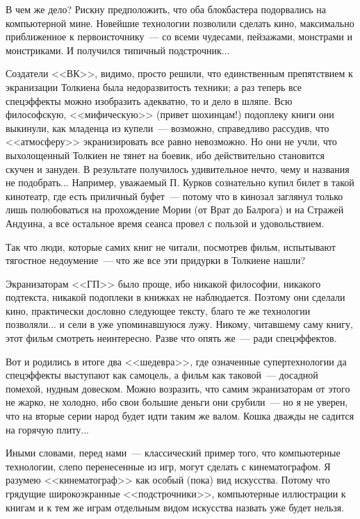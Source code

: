 \documentclass{scrbook}
\newcommand{\flqq}{<<}
\newcommand{\frqq}{>>}
\newcommand{\mdash}{~--- }
\begin{document}
В чем же дело? Рискну предположить, что оба блокбастера подорвались на компьютерной мине. Новейшие технологии позволили сделать кино, максимально приближенное к первоисточнику{\mdash}со всеми чудесами, пейзажами, монстрами и монстриками. И получился типичный подстрочник...

Создатели {\flqq}ВК{\frqq}, видимо, просто решили, что единственным препятствием к экранизации Толкиена была недоразвитость техники; а раз теперь все спецэффекты можно изобразить адекватно, то и дело в шляпе. Всю философскую, {\flqq}мифическую{\frqq} (привет шохинцам!) подоплеку книги они выкинули, как младенца из купели{\mdash}возможно, справедливо рассудив, что {\flqq}атмосферу{\frqq} экранизировать все равно невозможно. Но они не учли, что выхолощенный Толкиен не тянет на боевик, ибо действительно становится скучен и зануден. В результате получилось удивительное нечто, чему и названия не подобрать... Например, уважаемый П. Курков сознательно купил билет в такой кинотеатр, где есть приличный буфет{\mdash}потому что в кинозал заглянул только лишь полюбоваться на прохождение Мории (от Врат до Балрога) и на Стражей Андуина, а все остальное время сеанса провел с пользой и удовольствием.

Так что люди, которые самих книг не читали, посмотрев фильм, испытывают тягостное недоумение{\mdash}что же все эти придурки в Толкиене нашли?

Экранизаторам {\flqq}ГП{\frqq} было проще, ибо никакой философии, никакого подтекста, никакой подоплеки в книжках не наблюдается. Поэтому они сделали кино, практически дословно следующее тексту, благо те же технологии позволяли... и сели в уже упоминавшуюся лужу. Никому, читавшему саму книгу, этот фильм смотреть неинтересно. Разве что опять же{\mdash}ради спецэффектов.

Вот и родились в итоге два {\flqq}шедевра{\frqq}, где означенные супертехнологии да спецэффекты выступают как самоцель, а фильм как таковой{\mdash}досадной помехой, нудным довеском. Можно возразить, что самим экранизаторам от этого не жарко, не холодно, ибо свои большие деньги они срубили{\mdash}но я не уверен, что на вторые серии народ будет идти таким же валом. Кошка дважды не садится на горячую плиту...

Иными словами, перед нами{\mdash}классический пример того, что компьютерные технологии, слепо перенесенные из игр, могут сделать с кинематографом. Я разумею {\flqq}кинематограф{\frqq} как особый (пока) вид искусства. Потому что грядущие широкоэкранные {\flqq}подстрочники{\frqq}, компьютерные иллюстрации к книгам и к тем же играм отдельным видом искусства назвать уже будет нельзя.
\end{document}
